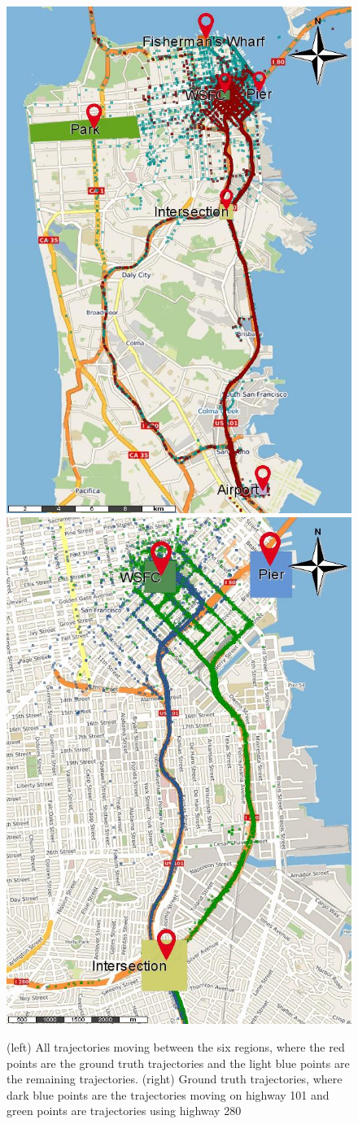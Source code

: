 \begin{figure}[ht!]
\centering
\includegraphics[width=.45\textwidth]{Images/new_CRAWDAD-Trajectories-Painted}
\includegraphics[width=.45\textwidth]{Images/new_CRAWDAD-Paths-Painted}
\caption{(left) All trajectories moving between the six regions, where the red points are the ground truth trajectories and the light blue points are the remaining trajectories. (right) Ground truth trajectories, where dark blue points are the trajectories moving on highway 101 and green points are trajectories using highway 280}
\label{fig:new_sanfrancisco_map_rois}
\end{figure}

